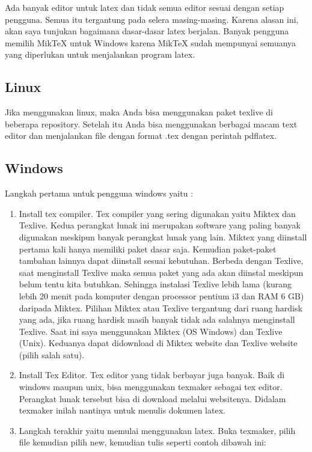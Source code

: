 Ada banyak editor untuk latex dan tidak semua editor sesuai dengan setiap pengguna. Semua itu tergantung pada selera masing-masing. Karena alasan ini, akan saya tunjukan bagaimana dasar-dasar latex berjalan. Banyak pengguna memilih MikTeX untuk Windows karena MikTeX sudah mempunyai semuanya yang diperlukan untuk menjalankan program latex.
\par \vspace{12pt}
\subsection{Linux}
\par \vspace{8pt}
Jika menggunakan linux, maka Anda bisa menggunakan paket texlive di beberapa repository. Setelah itu Anda bisa menggunakan berbagai macam text editor dan menjalankan file dengan format .tex dengan perintah pdflatex.
\par \vspace{12pt}
\subsection{Windows}
\par \vspace{12pt}
Langkah pertama untuk pengguna windows yaitu :

\begin{enumerate}
\item Install tex compiler. Tex compiler yang sering digunakan yaitu Miktex dan Texlive. Kedua perangkat lunak ini merupakan software yang paling banyak digunakan meskipun banyak perangkat lunak yang lain. Miktex yang diinstall pertama kali hanya memiliki paket dasar saja. Kemudian paket-paket tambahan lainnya dapat diinstall sesuai kebutuhan. Berbeda dengan Texlive, saat menginstall Texlive maka semua paket yang
ada akan diinstal meskipun belum tentu kita butuhkan. Sehingga instalasi Texlive lebih lama (kurang lebih 20 menit pada komputer dengan processor pentium i3 dan RAM 6 GB) daripada Miktex. Pilihan Miktex atau Texlive tergantung dari ruang hardisk yang ada, jika ruang hardisk masih banyak tidak ada salahnya menginstall Texlive. Saat ini saya menggunakan Miktex
(OS Windows) dan Texlive (Unix). Keduanya dapat didownload di Miktex website dan Texlive website (pilih salah satu).
\item Install Tex Editor. Tex editor yang tidak berbayar juga banyak. Baik di windows maupun unix, bisa menggunakan texmaker sebagai tex editor. Perangkat lunak tersebut bisa di download melalui websitenya. Didalam texmaker inilah nantinya untuk menulis dokumen latex.
\item Langkah terakhir yaitu memulai menggunakan latex. Buka texmaker, pilih file kemudian pilih new, kemudian tulis seperti contoh dibawah ini:
\setcounter{numberedCntC}{\theenumi}
\end{enumerate}

